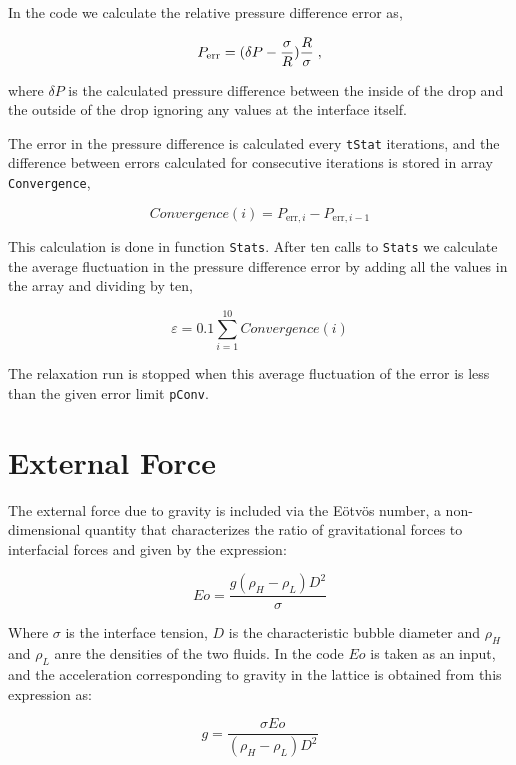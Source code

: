 \documentclass[12pt]{report}
\begin{document}
In the code we calculate the relative pressure difference error as,

\begin{equation}
P_{\rm err} = (\delta P - \frac{\sigma}{R})\frac{R}{\sigma}\;,
\end{equation}

where $\delta P$ is the calculated pressure difference between the inside of the drop and the outside of the drop ignoring any values at the interface itself.

The error in the pressure difference is calculated every \verb+tStat+ iterations, and the difference between errors  calculated for consecutive iterations is stored in array \verb+Convergence+,

\begin{equation}
Convergence(i) = P_{\textrm{err},i} - P_{\textrm{err}, i-1}
\end{equation}

This calculation is done in function \verb+Stats+. After ten calls to \verb+Stats+ we calculate the average fluctuation in the pressure difference error by adding all the values in the array and dividing by ten,

\begin{equation}
\varepsilon = 0.1\sum_{i=1}^{10}{Convergence(i)}
\end{equation}

The relaxation run is stopped when this average fluctuation of the error is less than the given error limit \verb+pConv+.

\section{External Force}
The external force due to gravity is included via the E\"otv\"os number, a non-dimensional quantity that characterizes the  ratio of gravitational forces to interfacial forces and given by the expression:

\begin{equation}
Eo = \frac{g\left(\rho_H-\rho_L\right)D^2}{\sigma}
\end{equation}

Where $\sigma$ is the interface tension, $D$ is the characteristic bubble diameter and $\rho_H$ and $\rho_L$ anre the densities of the two fluids. In the code $Eo$ is taken as an input, and the acceleration corresponding to gravity in the lattice is obtained from this expression as:

\begin{equation}
g = \frac{\sigma Eo}{\left(\rho_H-\rho_L\right)D^2}
\end{equation}
\end{document}
